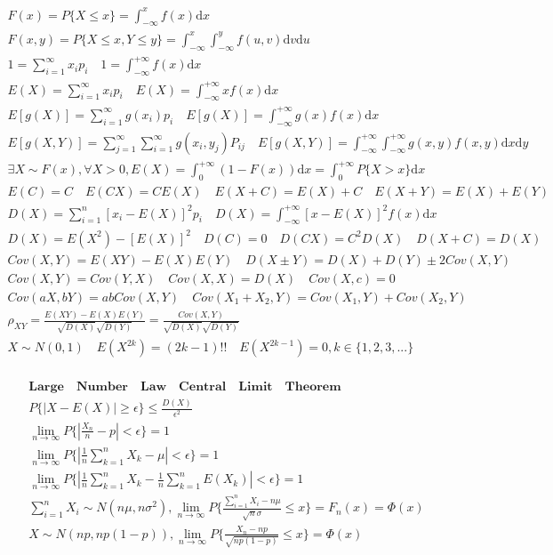 \documentclass{article}
\begin{document}
\begin{align*}
    F(x) = P\{X \le x\} = \int_{-\infty}^{x} f(x) \mathrm{d}x \\ 
    F(x,y) = P\{X \le x,Y \le y\} = \int_{-\infty}^{x}\int_{-\infty}^{y}f(u,v)\mathrm{d}v\mathrm{d}u \\
    1 = \sum_{i=1}^{\infty} x_{i}p_{i} \quad 1 = \int_{-\infty}^{+\infty}f(x)\mathrm{d}x \\ 
    E(X) = \sum_{i=1}^{\infty}x_{i}p_{i} \quad E(X) = \int_{-\infty}^{+\infty}xf(x)\mathrm{d}x \\  
    E[g(X)] = \sum_{i=1}^{\infty}g(x_{i})p_{i} \quad E[g(X)] = \int_{-\infty}^{+\infty}g(x)f(x)\mathrm{d} x \\
    E[g(X,Y)] = \sum_{j=1}^{\infty}\sum_{i=1}^{\infty}g(x_{i},y_{j})P_{ij} \quad E[g(X,Y)] = \int_{-\infty}^{+\infty}\int_{-\infty}^{+\infty}g(x,y)f(x,y)\mathrm{d}x\mathrm{d}y \\ 
    \exists X \sim F(x) ,\forall X > 0 , E(X) = \int_{0}^{+\infty}(1-F(x))\mathrm{d}x = \int_{0}^{+\infty} P\{X>x\}\mathrm{d}x \\ 
    E(C) = C \quad E(CX) = CE(X) \quad E(X+C) = E(X)+C \quad E(X+Y) = E(X)+E(Y) \\ 
    D(X) = \sum_{i=1}^{n}[x_{i}-E(X)]^2p_{i} \quad D(X) = \int_{-\infty}^{+\infty}[x-E(X)]^2f(x)\mathrm{d}x \\ 
    D(X) = E(X^2)-[E(X)]^2 \quad D(C) = 0 \quad D(CX)=C^2D(X) \quad D(X+C) = D(X) \\ 
    Cov(X,Y) = E(XY) - E(X)E(Y) \quad D(X\pm Y) = D(X)+D(Y)\pm 2Cov(X,Y) \\ 
    Cov(X,Y) = Cov(Y,X) \quad Cov(X,X) = D(X) \quad Cov(X,c) = 0 \\ 
    Cov(aX,bY) = abCov(X,Y) \quad Cov(X_{1}+X_{2},Y) = Cov(X_{1},Y)+Cov(X_{2},Y) \\ 
    \rho_{XY} = \frac{E(XY)-E(X)E(Y)}{\sqrt{D(X)}\sqrt{D(Y)}}= \frac{Cov(X,Y)}{\sqrt{D(X)}\sqrt{D(Y)}} \\ 
    X \sim N(0,1) \quad E(X^{2k}) = (2k-1)!! \quad E(X^{2k-1}) = 0 , k \in \{1,2,3,...\} \\ 
\end{align*}

\begin{align*}
    \bm{Large \quad Number \quad Law \quad Central \quad Limit \quad Theorem } \\ 
    P \{ {|X-E(X)|\ge \epsilon} \} \le \frac{D(X)}{\epsilon^{2}} \\
    \lim_{n \to \infty}P\{|\frac{X_{n}}{n}-p| < \epsilon\} = 1 \\
    \lim_{n \to \infty}P\{|\frac{1}{n}\sum_{k=1}^nX_{k}-\mu|<\epsilon\} = 1 \\
    \lim_{n \to \infty}P\{|\frac{1}{n}\sum_{k=1}^n X_{k} - \frac{1}{n}\sum_{k=1}^n E(X_{k})| < \epsilon\} = 1 \\ 
    \sum_{i=1}^{n}X_{i} \sim N(n\mu,n\sigma^2), \lim_{n \to \infty}P\{\frac{\sum_{i=1}^nX_{i}-n\mu}{\sqrt{n}\sigma} \le x\} = F_{n}(x) = \Phi(x) \\ 
    X \sim N(np,np(1-p)), \lim_{n \to \infty }P\{\frac{X_{n}-np}{\sqrt{np(1-p)}} \le x \} = \Phi(x) \\ 
\end{align*}
\end{document}
